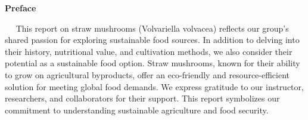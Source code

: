 \begin{center}
    \huge\bfseries{Preface}
\end{center}

\vspace{1cm}
{\fontsize{16pt}{16pt}\normalfont $\quad$ This report on straw mushrooms (Volvariella volvacea) reflects our group's shared passion for exploring sustainable food sources. In addition to delving into their history, nutritional value, and cultivation methods, we also consider their potential as a sustainable food option. Straw mushrooms, known for their ability to grow on agricultural byproducts, offer an eco-friendly and resource-efficient solution for meeting global food demands.
\medbreak
We express gratitude to our instructor, researchers, and collaborators for their support. This report symbolizes our commitment to understanding sustainable agriculture and food security.}\par